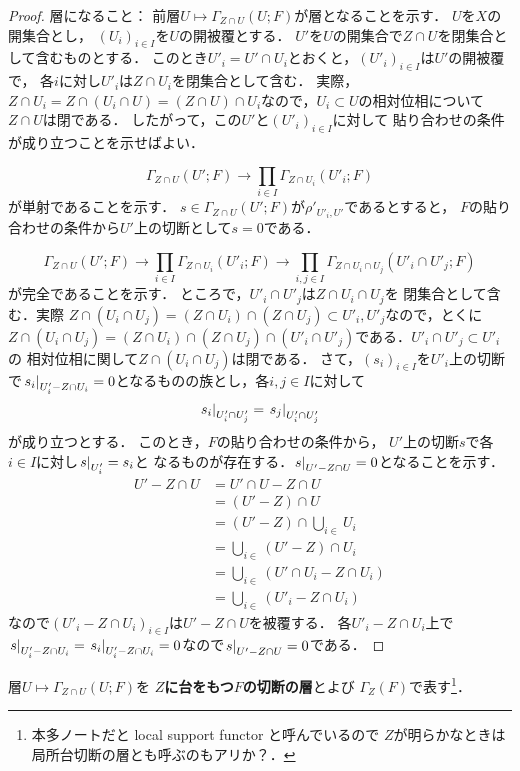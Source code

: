 \begin{proof}
    層になること：
    前層\(U\mapsto\Gamma_{Z\cap U}(U;F)\)が層となることを示す．
    \(U\)を\(X\)の開集合とし，
    \(\left(U_i\right)_{i\in I}\)を\(U\)の開被覆とする．
    \(U'\)を\(U\)の開集合で\(Z\cap U\)を閉集合として含むものとする．
    このとき\(U'_i=U'\cap U_i\)とおくと，\(
        \left(U'_i\right)_{i\in I}
    \)は\(U'\)の開被覆で，
    各\(i\)に対し\(U'_i\)は\(Z\cap U_i\)を閉集合として含む．
    実際，\(
        Z\cap U_i=Z\cap (U_i\cap U)=(Z\cap U)\cap U_i
    \)なので，\(U_i\subset U\)の相対位相について\(Z\cap U\)は閉である．
    したがって，この\(U'\)と\(\left(U'_i\right)_{i\in I}\)に対して
    貼り合わせの条件が成り立つことを示せばよい．

    \[
        \Gamma_{Z\cap U}(U';F)
        \to \prod_{i\in I}\Gamma_{Z\cap U_i}(U'_i;F)
    \]が単射であることを示す．
    \(s\in\Gamma_{Z\cap U}(U';F)\)が\(\rho'_{U'_i,U'}\)であるとすると，
    \(F\)の貼り合わせの条件から\(U'\)上の切断として\(s=0\)である．

    \[
        \Gamma_{Z\cap U}(U';F)
        \to \prod_{i\in I}\Gamma_{Z\cap U_i}(U'_i;F)
        \to \prod_{i,j\in I}
        \Gamma_{Z\cap U_i\cap U_j}(U'_i\cap U'_j;F)
    \]が完全であることを示す．
    ところで，\(U'_i\cap U'_j\)は\(Z\cap U_i\cap U_j\)を
    閉集合として含む．実際
    \(
        Z\cap(U_i\cap U_j)
        =(Z\cap U_i)\cap (Z\cap U_j)
        \subset U'_i, U'_j
    \)なので，とくに\(
        Z\cap(U_i\cap U_j)
        =(Z\cap U_i)\cap (Z\cap U_j)\cap (U'_i\cap U'_j)
    \)である．\(U'_i\cap U'_j\subset U'_i\)の
    相対位相に関して\(Z\cap(U_i\cap U_j)\)は閉である．
    さて，\(\left(s_i\right)_{i\in I}\)を\(U'_i\)上の切断で\(
        \mres[s_i]{U'_i-Z\cap U_i}=0
    \)となるものの族とし，各\(i,j\in I\)に対して\[
        \mres[s_i]{U'_i\cap U'_j}=
        \mres[s_j]{U'_i\cap U'_j}
    \]が成り立つとする．
    このとき，\(F\)の貼り合わせの条件から，
    \(U'\)上の切断\(s\)で各\(i\in I\)に対し\(\mres[s]{U'_i}=s_i\)と
    なるものが存在する．\(\mres[s]{U'-Z\cap U}=0\)となることを示す．
    \begin{align*}
        U'-Z\cap U
        &=U'\cap U- Z\cap U\\
        &=(U'- Z)\cap U\\
        &=(U'- Z)\cap \bigcup_{i\in}U_i\\
        &=\bigcup_{i\in} (U'- Z)\cap U_i\\
        &=\bigcup_{i\in} (U'\cap U_i- Z\cap U_i)\\
        &=\bigcup_{i\in} (U'_i- Z\cap U_i)
    \end{align*}
    なので\(\left(U'_i-Z\cap U_i\right)_{i\in I}\)は\(U'-Z\cap U\)を被覆する．
    各\(U'_i-Z\cap U_i\)上で\(
        \mres[s]{U'_i-Z\cap U_i}=\mres[s_i]{U'_i-Z\cap U_i}=0
    \)なので\(\mres[s]{U'-Z\cap U}=0\)である．
\end{proof}
\begin{DFN}
    層\(U\mapsto\Gamma_{Z\cap U}(U;F)\)を
    \textbf{\(Z\)に台をもつ\(F\)の切断の層}とよび
    \(\Gamma_Z(F)\)で表す\footnote{
        本多ノートだと local support functor と呼んでいるので
        \(Z\)が明らかなときは局所台切断の層とも呼ぶのもアリか？．
    }．
\end{DFN}

